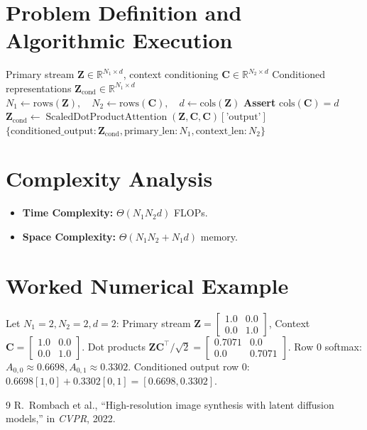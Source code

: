 \documentclass[11pt,a4paper]{article}
\theoremstyle{definition}
\begin{document}
\section{Problem Definition and Algorithmic Execution}

\begin{algorithm}[H]
\caption{Cross-Attention Context Conditioning Forward Pass}
\label{alg:cross_attn_cond}
\begin{algorithmic}[1]
\Require Primary stream $\mathbf{Z} \in \mathbb{R}^{N_1 \times d}$, context conditioning $\mathbf{C} \in \mathbb{R}^{N_2 \times d}$
\Ensure Conditioned representations $\mathbf{Z}_{\text{cond}} \in \mathbb{R}^{N_1 \times d}$
\State $N_1 \gets \text{rows}(\mathbf{Z}), \quad N_2 \gets \text{rows}(\mathbf{C}), \quad d \gets \text{cols}(\mathbf{Z})$
\State \textbf{Assert} $\text{cols}(\mathbf{C}) = d$
\State $\mathbf{Z}_{\text{cond}} \gets \operatorname{ScaledDotProductAttention}(\mathbf{Z}, \mathbf{C}, \mathbf{C})[\text{'output'}]$
\State \Return $\{\text{conditioned\_output}: \mathbf{Z}_{\text{cond}}, \text{primary\_len}: N_1, \text{context\_len}: N_2\}$
\end{algorithmic}
\end{algorithm}

\section{Complexity Analysis}
\begin{itemize}
    \item \textbf{Time Complexity:} $\Theta(N_1 N_2 d)$ FLOPs.
    \item \textbf{Space Complexity:} $\Theta(N_1 N_2 + N_1 d)$ memory.
\end{itemize}

\section{Worked Numerical Example}
Let $N_1 = 2, N_2 = 2, d = 2$:
Primary stream $\mathbf{Z} = \begin{bmatrix} 1.0 & 0.0 \\ 0.0 & 1.0 \end{bmatrix}$, Context $\mathbf{C} = \begin{bmatrix} 1.0 & 0.0 \\ 0.0 & 1.0 \end{bmatrix}$.
Dot products $\mathbf{Z}\mathbf{C}^\top / \sqrt{2} = \begin{bmatrix} 0.7071 & 0.0 \\ 0.0 & 0.7071 \end{bmatrix}$.
Row 0 softmax: $A_{0, 0} \approx 0.6698, A_{0, 1} \approx 0.3302$.
Conditioned output row 0: $0.6698 [1, 0] + 0.3302 [0, 1] = [0.6698, 0.3302]$.

\begin{thebibliography}{9}
 R.~Rombach et al., ``High-resolution image synthesis with latent diffusion models,'' in \emph{CVPR}, 2022.
\end{thebibliography}
\end{document}
